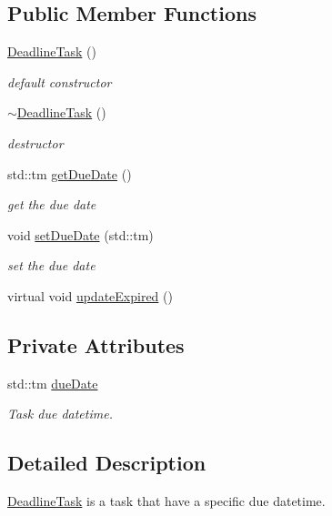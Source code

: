 \subsection*{Public Member Functions}
\begin{DoxyCompactItemize}
\item 
\hyperlink{class_do_lah_1_1_deadline_task_aefdded7f0ac55cf33cb7c28f597351f1}{Deadline\+Task} ()
\begin{DoxyCompactList}\small\item\em default constructor \end{DoxyCompactList}\item 
\hyperlink{class_do_lah_1_1_deadline_task_a06b2489db2e5ff4050ed3c501c179fb3}{$\sim$\+Deadline\+Task} ()
\begin{DoxyCompactList}\small\item\em destructor \end{DoxyCompactList}\item 
std\+::tm \hyperlink{class_do_lah_1_1_deadline_task_a5adc078db06d01e02c672b2744c01ddc}{get\+Due\+Date} ()
\begin{DoxyCompactList}\small\item\em get the due date \end{DoxyCompactList}\item 
void \hyperlink{class_do_lah_1_1_deadline_task_a2bb8f4360b80ce4d3c8c3da417485691}{set\+Due\+Date} (std\+::tm)
\begin{DoxyCompactList}\small\item\em set the due date \end{DoxyCompactList}\item 
virtual void \hyperlink{class_do_lah_1_1_deadline_task_ad6bb39417228f7cc6a649c5e910b4f8b}{update\+Expired} ()
\end{DoxyCompactItemize}
\subsection*{Private Attributes}
\begin{DoxyCompactItemize}
\item 
std\+::tm \hyperlink{class_do_lah_1_1_deadline_task_a3aafedb6e075ec0e8de68a76aaf79376}{due\+Date}
\begin{DoxyCompactList}\small\item\em Task due datetime. \end{DoxyCompactList}\end{DoxyCompactItemize}


\subsection{Detailed Description}
\hyperlink{class_do_lah_1_1_deadline_task}{Deadline\+Task} is a task that have a specific due datetime. 

